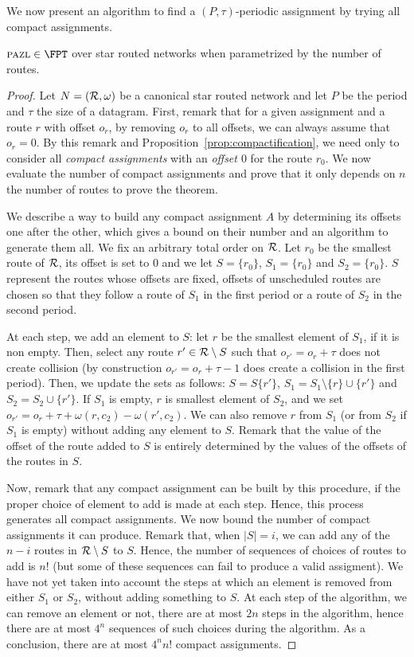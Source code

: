 We now present an algorithm to find a $(P,\tau)$-periodic assignment by trying all compact assignments.

\begin{theorem}\label{th:FPT}
$\pma \in \FPT$ over star routed networks when parametrized by the number of routes.
\end{theorem}
\begin{proof}
Let $N = ({\cal R},\omega)$ be a canonical star routed network and let $P$ be the period and $\tau$ the size of a datagram. First, remark that for a given assignment and a route $r$ with offset $o_r$, by removing $o_r$ to all offsets, we can always assume that $o_r = 0$. By this remark and Proposition~\ref{prop:compactification}, we need only to consider all \emph{compact assignments} with an \emph{offset $0$} for the route $r_0$. We now evaluate the number of compact assignments and prove that it only depends on $n$ the number of routes to prove the theorem.

 We describe a way to build any compact assignment $A$ by determining its offsets one after the other, which gives a bound on their number and an algorithm to generate them all. We fix an arbitrary total order on ${\cal R}$. Let $r_0$ be the smallest route of $\cal{R}$, its offset is set to $0$ and we let $S = \{r_0\}$,
 $S_1 = \{r_0\}$ and $S_2 = \{r_0\}$. $S$ represent the routes whose offsets are fixed, 
 offsets of unscheduled routes are chosen so that they follow a route of $S_1$ in the first period or a route of $S_2$ in the second period.

 At each step, we add an element to $S$: let $r$ be the smallest element of $S_1$, if it is non empty. Then, select any route $r' \in {\cal R} \setminus S$ 
 such that $o_{r'} = o_{r} + \tau$ does not create collision (by construction $o_{r'} = o_{r} + \tau - 1$ does create a collision in the first period). Then, we update the sets as follows:
 $S = S \{r'\}$, $S_1 = S_1 \setminus \{r\} \cup \{r'\}$ and $S_2 = S_2 \cup \{r'\}$. If 
 $S_1$ is empty, $r$ is smallest element of $S_2$, and we set $o_{r'} = o_{r} + \tau + \omega(r,c_2) - \omega(r',c_2)$.
 We can also remove $r$ from $S_1$ (or from $S_2$ if $S_1$ is empty) without adding any element to $S$. Remark that the value of the offset of the route added to $S$ is entirely determined by the values of the offsets of the routes in $S$.

 Now, remark that any compact assignment can be built by this procedure, if the proper choice of element to add is made at each step. Hence, this process generates all compact assignments. We now bound the number of compact assignments it can produce. Remark that, when $|S| = i$, we can add any of the $n-i$ routes in ${\cal R} \setminus S$ to $S$. Hence, the number of sequences of choices of routes to add is $n!$ (but some of these sequences can fail to produce a valid assigment). We have not yet taken into account the steps at which an element is removed from either $S_1$ or $S_2$, without adding something to $S$. At each step of the algorithm, we can remove an element or not, there are at most $2n$ steps in the algorithm, hence there are at most $4^n$ sequences of such choices during the algorithm. As a conclusion, there are at most $4^nn!$ compact assignments.


\end{proof}
